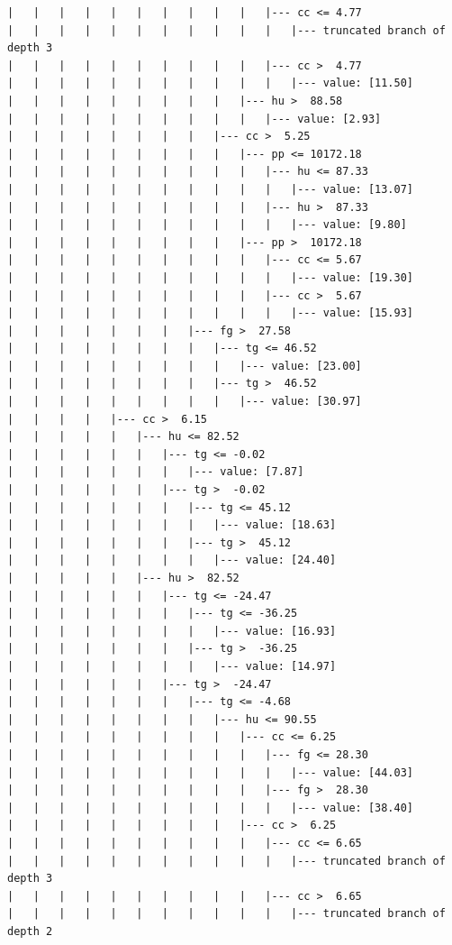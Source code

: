 \documentclass[UTF8, a4paper]{ctexart}
\begin{document}
\begin{lstlisting}
|   |   |   |   |   |   |   |   |   |   |--- cc <= 4.77
|   |   |   |   |   |   |   |   |   |   |   |--- truncated branch of depth 3
|   |   |   |   |   |   |   |   |   |   |--- cc >  4.77
|   |   |   |   |   |   |   |   |   |   |   |--- value: [11.50]
|   |   |   |   |   |   |   |   |   |--- hu >  88.58
|   |   |   |   |   |   |   |   |   |   |--- value: [2.93]
|   |   |   |   |   |   |   |   |--- cc >  5.25
|   |   |   |   |   |   |   |   |   |--- pp <= 10172.18
|   |   |   |   |   |   |   |   |   |   |--- hu <= 87.33
|   |   |   |   |   |   |   |   |   |   |   |--- value: [13.07]
|   |   |   |   |   |   |   |   |   |   |--- hu >  87.33
|   |   |   |   |   |   |   |   |   |   |   |--- value: [9.80]
|   |   |   |   |   |   |   |   |   |--- pp >  10172.18
|   |   |   |   |   |   |   |   |   |   |--- cc <= 5.67
|   |   |   |   |   |   |   |   |   |   |   |--- value: [19.30]
|   |   |   |   |   |   |   |   |   |   |--- cc >  5.67
|   |   |   |   |   |   |   |   |   |   |   |--- value: [15.93]
|   |   |   |   |   |   |   |--- fg >  27.58
|   |   |   |   |   |   |   |   |--- tg <= 46.52
|   |   |   |   |   |   |   |   |   |--- value: [23.00]
|   |   |   |   |   |   |   |   |--- tg >  46.52
|   |   |   |   |   |   |   |   |   |--- value: [30.97]
|   |   |   |   |--- cc >  6.15
|   |   |   |   |   |--- hu <= 82.52
|   |   |   |   |   |   |--- tg <= -0.02
|   |   |   |   |   |   |   |--- value: [7.87]
|   |   |   |   |   |   |--- tg >  -0.02
|   |   |   |   |   |   |   |--- tg <= 45.12
|   |   |   |   |   |   |   |   |--- value: [18.63]
|   |   |   |   |   |   |   |--- tg >  45.12
|   |   |   |   |   |   |   |   |--- value: [24.40]
|   |   |   |   |   |--- hu >  82.52
|   |   |   |   |   |   |--- tg <= -24.47
|   |   |   |   |   |   |   |--- tg <= -36.25
|   |   |   |   |   |   |   |   |--- value: [16.93]
|   |   |   |   |   |   |   |--- tg >  -36.25
|   |   |   |   |   |   |   |   |--- value: [14.97]
|   |   |   |   |   |   |--- tg >  -24.47
|   |   |   |   |   |   |   |--- tg <= -4.68
|   |   |   |   |   |   |   |   |--- hu <= 90.55
|   |   |   |   |   |   |   |   |   |--- cc <= 6.25
|   |   |   |   |   |   |   |   |   |   |--- fg <= 28.30
|   |   |   |   |   |   |   |   |   |   |   |--- value: [44.03]
|   |   |   |   |   |   |   |   |   |   |--- fg >  28.30
|   |   |   |   |   |   |   |   |   |   |   |--- value: [38.40]
|   |   |   |   |   |   |   |   |   |--- cc >  6.25
|   |   |   |   |   |   |   |   |   |   |--- cc <= 6.65
|   |   |   |   |   |   |   |   |   |   |   |--- truncated branch of depth 3
|   |   |   |   |   |   |   |   |   |   |--- cc >  6.65
|   |   |   |   |   |   |   |   |   |   |   |--- truncated branch of depth 2

\end{lstlisting}
\end{document}
